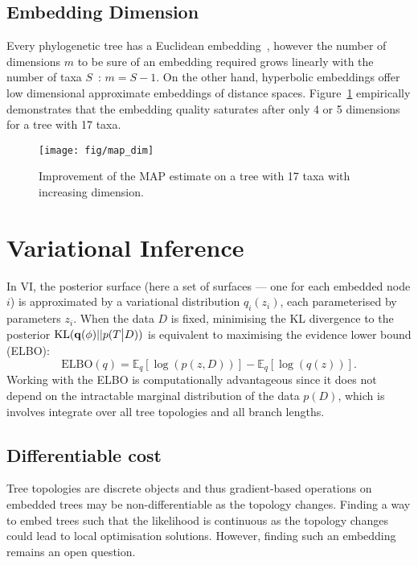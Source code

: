\documentclass[11pt, twocolumn]{article}
\newcommand{\be}{\begin{equation*}}
\newcommand{\ee}{\end{equation*}}
\begin{document}
\subsection{Embedding Dimension}
Every phylogenetic tree has a Euclidean embedding~\cite{devienne2011euclidean}, however the number of dimensions $m$ to be sure of an embedding required grows linearly with the number of taxa $S$~\cite{deza1997geometry}: $m=S-1$.
On the other hand, hyperbolic embeddings offer low dimensional approximate embeddings of distance spaces.
Figure~\ref{fig:map_dim} empirically demonstrates that the embedding quality saturates after only 4 or 5 dimensions for a tree with 17 taxa.

\begin{figure}[htbp] \label{fig:map_dim}
\begin{center}
    \texttt{[image: fig/map\_dim]}
\end{center}
\caption{Improvement of the MAP estimate on a tree with 17 taxa with increasing dimension.}
\end{figure}

\clearpage
\section{Variational Inference}
In VI, the posterior surface (here a set of surfaces --- one for each embedded node $i$) is approximated by a variational distribution $q_{i}(z_{i})$, each parameterised by parameters $z_{i}$.
When the data $D$ is fixed, minimising the KL divergence to the posterior $\text{KL}({\bf q}(\phi)||p(T\big|D))$ is equivalent to maximising the evidence lower bound (ELBO):
\be
\text{ELBO}(q) = \mathbb{E}_{q}[\log(p(z,D))] - \mathbb{E}_{q}[\log(q(z))].
\ee
Working with the ELBO is computationally advantageous since it does not depend on the intractable marginal distribution of the data $p(D)$, which is involves integrate over all tree topologies and all branch lengths.

\subsection{Differentiable cost}
Tree topologies are discrete objects and thus gradient-based operations on embedded trees may be non-differentiable as the topology changes.
Finding a way to embed trees such that the likelihood is continuous as the topology changes could lead to local optimisation solutions.
However, finding such an embedding remains an open question.
\end{document}
